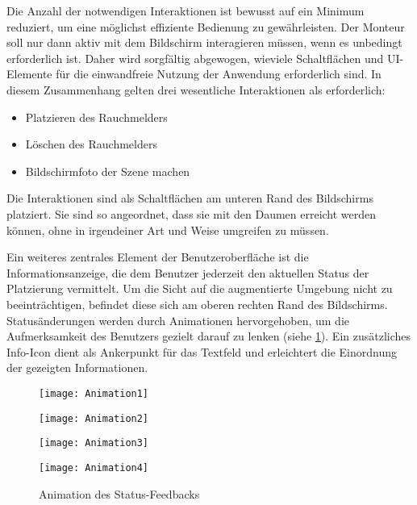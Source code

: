 Die Anzahl der notwendigen Interaktionen ist bewusst auf ein Minimum reduziert, um eine möglichst effiziente Bedienung zu gewährleisten. Der Monteur soll nur dann aktiv mit dem Bildschirm interagieren müssen, wenn es unbedingt erforderlich ist. Daher wird sorgfältig abgewogen, wieviele Schaltflächen und UI-Elemente für die einwandfreie Nutzung der Anwendung erforderlich sind. In diesem Zusammenhang gelten drei wesentliche Interaktionen als erforderlich:

\begin{itemize}
    \item Platzieren des Rauchmelders
    \item Löschen des Rauchmelders
    \item Bildschirmfoto der Szene machen
\end{itemize}

Die Interaktionen sind als Schaltflächen am unteren Rand des Bildschirms platziert. Sie sind so angeordnet, dass sie mit den Daumen erreicht werden können, ohne in irgendeiner Art und Weise umgreifen zu müssen. 

Ein weiteres zentrales Element der Benutzeroberfläche ist die Informationsanzeige, die dem Benutzer jederzeit den aktuellen Status der Platzierung vermittelt. Um die Sicht auf die augmentierte Umgebung nicht zu beeinträchtigen, befindet diese sich am oberen rechten Rand des Bildschirms. Statusänderungen werden durch Animationen hervorgehoben, um die Aufmerksamkeit des Benutzers gezielt darauf zu lenken (siehe \ref{fig:Animation}). Ein zusätzliches Info-Icon dient als Ankerpunkt für das Textfeld und erleichtert die Einordnung der gezeigten Informationen.

\begin{figure}[ht]
    \centering
    \begin{minipage}{\textwidth}
        \begin{minipage}{0.45\textwidth}
            \centering
            \texttt{[image: Animation1]}
        \end{minipage}
        \begin{minipage}{0.45\textwidth}
            \centering
            \texttt{[image: Animation2]}
        \end{minipage}
    \end{minipage}
    \begin{minipage}{\textwidth}
        \begin{minipage}{0.45\textwidth}
            \centering
            \texttt{[image: Animation3]}
        \end{minipage}
        \begin{minipage}{0.45\textwidth}
            \centering
            \texttt{[image: Animation4]}
        \end{minipage}
    \end{minipage}
    \caption{Animation des Status-Feedbacks}
    \label{fig:Animation}
\end{figure}

